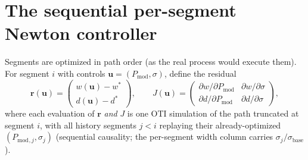 \documentclass[11pt]{article}
\newcommand{\Pmod}{P_{\mathrm{mod}}}
\begin{document}
\section{The sequential per-segment Newton controller}
\label{sec:newton}

Segments are optimized in path order (as the real process would execute
them). For segment $i$ with controls
$\mathbf{u} = (\Pmod{}, \sigma)$, define the residual
\begin{equation}
  \mathbf{r}(\mathbf{u}) =
  \begin{pmatrix} w(\mathbf{u}) - w^\ast \\ d(\mathbf{u}) - d^\ast \end{pmatrix},
  \qquad
  J(\mathbf{u}) =
  \begin{pmatrix}
    \partial w/\partial \Pmod{} & \partial w/\partial \sigma\\
    \partial d/\partial \Pmod{} & \partial d/\partial \sigma
  \end{pmatrix},
\end{equation}
where each evaluation of $\mathbf{r}$ \emph{and} $J$ is one OTI simulation of
the path truncated at segment $i$, with all history segments $j<i$ replaying
their already-optimized $(\Pmod{}_{,j}, \sigma_j)$ (sequential causality; the
per-segment width column carries $\sigma_j/\sigma_{\mathrm{base}}$).
\end{document}
